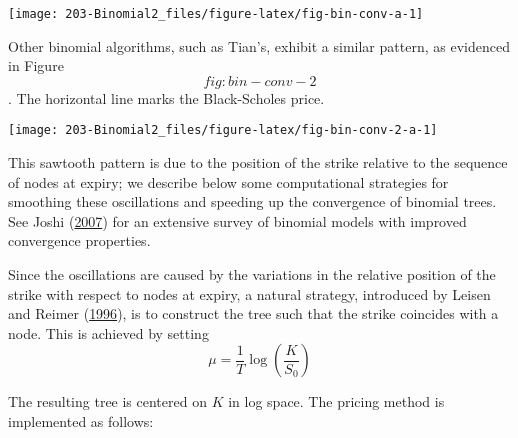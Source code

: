 \documentclass[justified]{tufte-book}
\begin{document}
\texttt{[image: 203-Binomial2\_files/figure-latex/fig-bin-conv-a-1]}

Other binomial algorithms, such as Tian's, exhibit a similar pattern, as
evidenced in Figure~\[fig:bin-conv-2\]. The horizontal line marks the
Black-Scholes price.

\texttt{[image: 203-Binomial2\_files/figure-latex/fig-bin-conv-2-a-1]}

This sawtooth pattern is due to the position of the strike relative to
the sequence of nodes at expiry;
we describe below some computational strategies
for smoothing these oscillations and speeding up the convergence of
binomial trees. See
Joshi (\protect\hyperlink{ref-Joshi2007}{2007}) for an extensive survey of binomial models with
improved convergence properties.

Since the oscillations are caused by the variations in the relative
position of the strike with respect to nodes at expiry, a natural
strategy, introduced by Leisen and Reimer (\protect\hyperlink{ref-Leisen1996}{1996}), is to construct the tree such that
the strike coincides with a node. This is achieved by setting
\[\mu = \frac{1}{T} \log \left(\frac{K}{S_0} \right)\]

The resulting tree is centered on \(K\) in log space. The pricing method
is implemented as follows:
\end{document}
